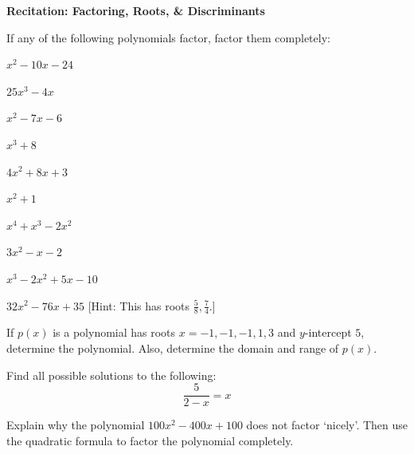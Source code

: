 \documentclass[11pt,letterpaper]{article}
\begin{document}

\phantom{} \hfill {\bfseries \Large Recitation: Factoring, Roots, \& Discriminants} \hfill \phantom{} \par\vspace{0.5cm}

 If any of the following polynomials factor, factor them completely:
	\begin{2enumerate}
	\item $x^2 - 10x - 24$
	\item $25x^3 - 4x$
	\item $x^2 - 7x - 6$
	\item $x^3 + 8$
	\item $4x^2 + 8x + 3$
	\item $x^2 + 1$
	\item $x^4 + x^3 - 2x^2$
	\item $3x^2 - x - 2$
	\item $x^3 - 2x^2 + 5x - 10$
	\item $32x^2 - 76x + 35$ [Hint: This has roots $\tfrac{5}{8}, \tfrac{7}{4}$.]
	\end{2enumerate}



\newpage



 If $p(x)$ is a polynomial has roots $x= -1, -1, -1, 1, 3$ and $y$-intercept $5$, determine the polynomial. Also, determine the domain and range of $p(x)$. \vfill



 Find all possible solutions to the following:
	\[
	\dfrac{5}{2 - x}= x
	\] \vfill



 Explain why the polynomial $100x^2 - 400x + 100$ does not factor `nicely'. Then use the quadratic formula to factor the polynomial completely. \vfill
\end{document}
